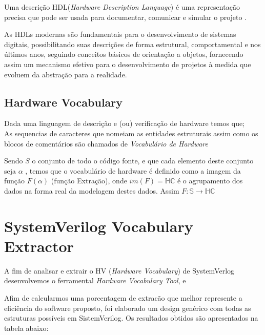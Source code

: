 \documentclass[12pt, twocolumn, a4paper]{article}
\begin{document}
\quad Uma descrição HDL(\textit{Hardware Description Language}) é uma representação precisa que pode ser usada para documentar, comunicar e simular o projeto \cite{Miller-Karlow}.

As HDLs modernas são fundamentais para o desenvolvimento de sistemas digitais, possibilitando suas descrições de forma estrutural, comportamental e nos últimos anos, seguindo conceitos básicos de orientação a objetos, fornecendo assim um mecanismo efetivo para o desenvolvimento de projetos à medida que evoluem da abstração para a realidade.

	\subsection{Hardware Vocabulary} 
	
Dada uma linguagem de descrição e (ou) verificação de hardware temos que;\\
As sequencias de caracteres que nomeiam as entidades estruturais assim como os blocos de comentários são chamados de \textit{Vocabulário de Hardware} 

Sendo $S$ o conjunto de todo o código fonte, e que cada elemento deste conjunto seja $\alpha$ , temos que o vocabulário de hardware é definido como  a imagem da função $F(\alpha)$ (função Extração), onde $im(F) = \mathbb{HC}$ é o agrupamento dos dados na forma real da modelagem destes dados. Assim $F: \mathbb{S}\rightarrow\mathbb{HC}$
	\section{SystemVerilog Vocabulary Extractor}
	
\quad A fim de analisar e extrair o HV (\textit{Hardware Vocabulary}) de SystemVerlog desenvolvemos o ferramental \textit{Hardware 	 Vocabulary Tool}, e \cite{AST}
	
	
	\quad Afim de calcularmos uma porcentagem de extracão que melhor represente a eficiência do software proposto, foi elaborado um design genérico com todas as estruturas possíveis em SistemVerilog. Os resultados obtidos são apresentados na tabela abaixo:
\end{document}

